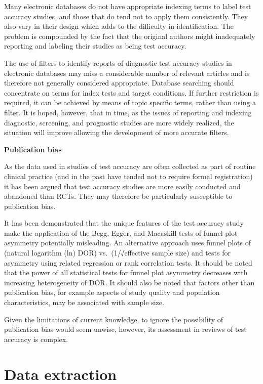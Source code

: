 \documentclass[
  11pt,
  a4paper,
  DIV=11,
  numbers=noendperiod]{scrreprt}
\begin{document}
Many electronic databases do not have appropriate indexing terms to
label test accuracy studies, and those that do tend not to apply them
consistently. They also vary in their design which adds to the
difficulty in identification. The problem is compounded by the fact that
the original authors might inadequately reporting and labeling their
studies as being test accuracy.

The use of filters to identify reports of diagnostic test accuracy
studies in electronic databases may miss a considerable number of
relevant articles and is therefore not generally considered appropriate.
Database searching should concentrate on terms for index tests and
target conditions. If further restriction is required, it can be
achieved by means of topic specific terms, rather than using a filter.
It is hoped, however, that in time, as the issues of reporting and
indexing diagnostic, screening, and prognostic studies are more widely
realized, the situation will improve allowing the development of more
accurate filters.

\textbf{Publication bias}

As the data used in studies of test accuracy are often collected as part
of routine clinical practice (and in the past have tended not to require
formal registration) it has been argued that test accuracy studies are
more easily conducted and abandoned than RCTs. They may therefore be
particularly susceptible to publication bias.

It has been demonstrated that the unique features of the test accuracy
study make the application of the Begg, Egger, and Macaskill tests of
funnel plot asymmetry potentially misleading. An alternative approach
uses funnel plots of (natural logarithm (ln) DOR) vs.~(1/√effective
sample size) and tests for asymmetry using related regression or rank
correlation tests. It should be noted that the power of all statistical
tests for funnel plot asymmetry decreases with increasing heterogeneity
of DOR. It should also be noted that factors other than publication
bias, for example aspects of study quality and population
characteristics, may be associated with sample size.

Given the limitations of current knowledge, to ignore the possibility of
publication bias would seem unwise, however, its assessment in reviews
of test accuracy is complex.

\section{Data extraction}\label{data-extraction-1}
\end{document}
